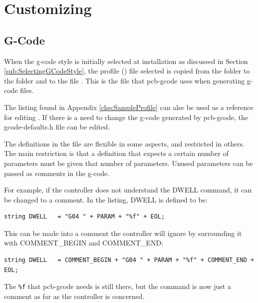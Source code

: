 \documentclass[11pt]{book}
\begin{document}
%
\chapter{Customizing}
%

%
%
\section{G-Code}\label{sec:CustomizingGCode}

When the g-code style is initially selected at installation as discussed in Section \vref{sub:SelectingGCodeStyle}, the profile () file selected is copied from the  folder to the  folder and to the file . This is the file that pcb-gcode uses when generating g-code files.

The listing found in Appendix \vref{chp:SampleProfile} can alse be used as a reference for editing . If there is a need to change the g-code generated by pcb-gcode, the gcode-defaults.h file can be edited.

The definitions in the file are flexible in some aspects, and restricted in others. The main restriction is that a definition that expects a certain number of parameters must be given that number of parameters. Unused parameters can be passed as comments in the g-code. 

For example, if the controller does not understand the DWELL command, it can be changed to a comment. In the listing, DWELL is defined to be:

\begin{lstlisting}[firstnumber=46]
string DWELL   = "G04 " + PARAM + "%f" + EOL;
\end{lstlisting}

This can be made into a comment the controller will ignore by surrounding it with COMMENT\_{}BEGIN and COMMENT\_{}END:

\begin{lstlisting}[firstnumber=46]
string DWELL   = COMMENT_BEGIN + "G04 " + PARAM + "%f" + COMMENT_END + EOL;
\end{lstlisting}

The \lstinline!%f! that pcb-gcode needs is still there, but the command is now just a comment as far as the controller is concerned.
\end{document}
